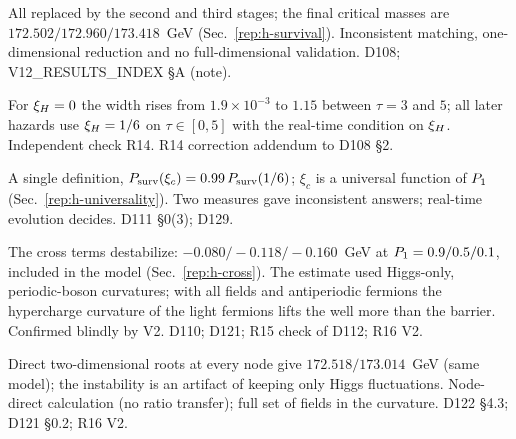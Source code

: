 \begin{description}
{All replaced by the second and third stages; the final critical masses are $172.502/\allowbreak 172.960/\allowbreak 173.418$~GeV (Sec.~\ref{rep:h-survival}).}
{Inconsistent matching, one-dimensional reduction and no full-dimensional validation.}
{D108; V12\_RESULTS\_INDEX \S A (note).}

{For $\xi_H=0$ the width rises from $1.9\times10^{-3}$ to $1.15$ between $\tau=3$ and $5$; all later hazards use $\xi_H=1/6$ on $\tau\in[0,5]$ with the real-time condition on $\xi_H$.}
{Independent check R14.}
{R14 correction addendum to D108 \S2.}

{A single definition, $P_{\rm surv}(\xi_c)=0.99\,P_{\rm surv}(1/6)$; $\xi_c$ is a universal function of $P_1$ (Sec.~\ref{rep:h-universality}).}
{Two measures gave inconsistent answers; real-time evolution decides.}
{D111 \S0(3); D129.}

{The cross terms destabilize: $-0.080/\allowbreak{-}0.118/\allowbreak{-}0.160$~GeV at $P_1=0.9/\allowbreak 0.5/\allowbreak 0.1$, included in the model (Sec.~\ref{rep:h-cross}).}
{The estimate used Higgs-only, periodic-boson curvatures; with all fields and antiperiodic fermions the hypercharge curvature of the light fermions lifts the well more than the barrier. Confirmed blindly by V2.}
{D110; D121; R15 check of D112; R16 V2.}

{Direct two-dimensional roots at every node give $172.518/\allowbreak 173.014$~GeV (same model); the instability is an artifact of keeping only Higgs fluctuations.}
{Node-direct calculation (no ratio transfer); full set of fields in the curvature.}
{D122 \S4.3; D121 \S0.2; R16 V2.}


\end{description}
